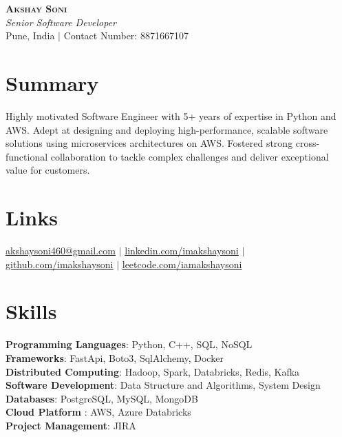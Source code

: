\documentclass[letterpaper,11pt]{article}
\begin{document}

\begin{center}
    \textbf{\Huge \scshape  Akshay Soni} \\ \vspace{1pt}
    \small \textit{Senior Software Developer } \\
    Pune, India $|$ {Contact Number: 8871667107}
\end{center}

\section*{Summary}
Highly motivated Software Engineer with 5+ years of expertise in Python and AWS. Adept at designing and deploying high-performance, scalable software solutions using microservices architectures on AWS. Fostered strong cross-functional collaboration to tackle complex challenges and deliver exceptional value for customers. 

\section{Links}
 \small { \href{mailto:akshaysoni460@gmail.com}{\underline{akshaysoni460@gmail.com}} $|$
  \href{https://www.linkedin.com/in/imakshaysoni}{\underline{linkedin.com/imakshaysoni}} $|$
    \href{https://github.com/imakshaysoni}{\underline{github.com/imakshaysoni}} $|$
     \href{https://leetcode.com/iamakshaysoni}{\underline{leetcode.com/iamakshaysoni}} 
    }

\section{Skills}
 \begin{itemize}[leftmargin=0.15in, label={}]
    \small{\item{
     \textbf{Programming Languages}{: Python, C++, SQL, NoSQL} \\
     \textbf{Frameworks}{: FastApi, Boto3, SqlAlchemy, Docker} \\   
\textbf{Distributed Computing}{: Hadoop, Spark, Databricks, Redis, Kafka} \\
     \textbf{Software Development}{: Data Structure and Algorithms, System Design} \\  \textbf{Databases}{: PostgreSQL, MySQL, MongoDB} \\\textbf{Cloud Platform }{: AWS, Azure Databricks}\\
     \textbf{Project Management}{: JIRA}
    }}
 \end{itemize}
\end{document}
